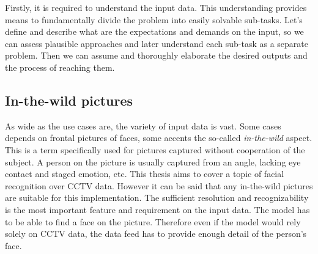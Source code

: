 Firstly, it is required to understand the input data. This understanding provides means to fundamentally divide the problem into easily solvable sub-tasks. Let's define and describe what are the expectations and demands on the input, so we can assess plausible approaches and later understand each sub-task as a separate problem. Then we can assume and thoroughly elaborate the desired outputs and the process of reaching them.

\subsection{In-the-wild pictures}

As wide as the use cases are, the variety of input data is vast. Some cases depends on frontal pictures of faces, some accents the so-called \textit{in-the-wild} aspect. This is a term specifically used for pictures captured without cooperation of the subject. A person on the picture is usually captured from an angle, lacking eye contact and staged emotion, etc. This thesis aims to cover a topic of facial recognition over CCTV data. However it can be said that any in-the-wild pictures are suitable for this implementation. The sufficient resolution and recognizability is the most important feature and requirement on the input data. The model has to be able to find a face on the picture. Therefore even if the model would rely solely on CCTV data, the data feed has to provide enough detail of the person's face.

